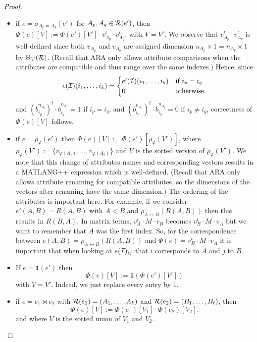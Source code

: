 \begin{proof}
\begin{itemize}
\item if $e=\sigma_{A_p=A_q}(e')$ for $A_p,A_q\in\mathcal{R}(e')$, then 
$
\Phi(e)[V]:=\Phi(e')[V']\cdot v_{A_p}^t\cdot v_{A_q}^t
$,
with $V=V'$. We observe that $v_{A_p}^t\cdot v_{A_q}^t$ is well-defined since both $v_{A_p}$ and $v_{A_q}$ are assigned dimension $n_{A_p}\times 1=n_{A_q}\times 1$ by $\Theta_V(\mathcal{R})$. (Recall that ARA only allows attribute comparisons when the attributes are compatible and thus range over the same indexes.)
Hence, since  
$$
e(\mathcal{I})(i_1,\ldots,i_k)=\begin{cases}
e'(\mathcal{I})(i_1,\ldots,i_k) & \text{if $i_p=i_q$}\\
0 & \text{otherwise}.
\end{cases}
$$
and $(b_{i_p}^{n_{A_i}})^t\cdot b_{i_q}^{n_{A_j}}=1$ if $i_p=i_q$, and  $(b_{i_p}^{n_{A_i}})^t\cdot b_{i_q}^{n_{A_j}}=0$ if $i_p\neq i_q$, correctness of $\Phi(e)[V]$ follows.
\item if $e=\rho_{\varphi}(e')$ then 
$\Phi(e)[V]:=\Phi(e')[\rho_\varphi(V')]$, where $\rho_\varphi(V'):=\{v_{\varphi(A_1)},\ldots,v_{\varphi(A_k)}\}$ and $V$ is the sorted  version of $\rho_\varphi(V')$. We note that this change of attributes names and corresponding vectors results in a MATLANG++ expression which is well-defined. (Recall that ARA only allows attribute renaming for compatible attributes, so the dimensions of the vectors after renaming have the same dimension.) The ordering of the attributes is important here. For example, 
if we consider $e'(A,B)=R(A,B)$ with $A<B$ and $\rho_{A\leftrightarrow B}(R(A,B))$
then this results in $R(B,A)$. In matrix terms, $v_A^t\cdot M\cdot v_B$ becomes 
$v_B^t\cdot M\cdot v_A$ but we want to remember that $A$ was the first index. So, for the correspondence between $e(A,B)=\rho_{A\leftrightarrow B}(R(A,B))$  and 
$\Phi(e)=v_B^t\cdot M\cdot v_A$ it is important that when looking at $e(\mathcal{I})_{ij}$ that $i$ corresponds to $A$ and $j$ to $B$. 
\item If $e=\mathbf{1}(e')$  then 
$$
\Phi(e)[V]:=\mathbf{1}(\Phi(e')[V'])
$$
with $V=V'$. Indeed, we just replace every entry  by $1$.
\item if $e=e_1\bowtie e_2$ with $\mathcal{R}(e_1)=(A_1,\ldots, A_k)$ and $\mathcal{R}(e_2)=(B_1,\ldots,B_\ell)$, then
$$
\Phi(e)[V]:=\Phi(e_1)[V_1]\cdot \Phi(e_2)[V_2].
$$
and where $V$ is the sorted union of $V_1$ and $V_2$.
\end{itemize}
\end{proof}

